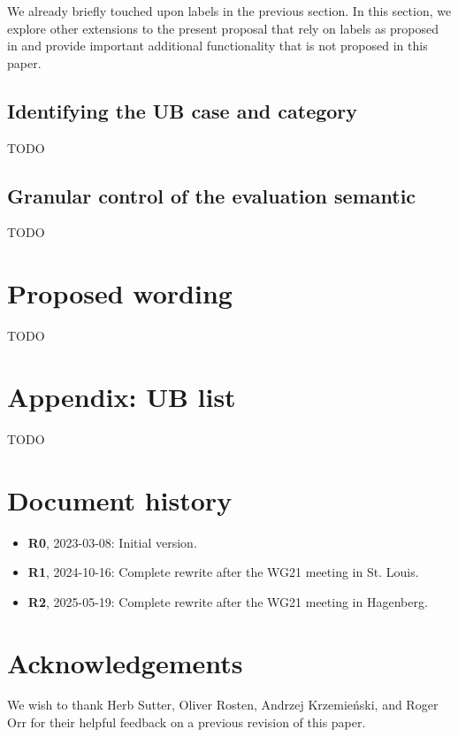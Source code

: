 We already briefly touched upon labels in the previous section. In this section, we explore other extensions to the present proposal that rely on labels as proposed in \cite{P3400R1} and provide important additional functionality that is not proposed in this paper.

\subsection{Identifying the UB case and category}
\label{category}

TODO

\subsection{Granular control of the evaluation semantic}
\label{semantic}

TODO



\section{Proposed wording}
\label{wording}

TODO

\section*{Appendix: UB list}

TODO

\section*{Document history}
\begin{itemize}
\item \textbf{R0}, 2023-03-08: Initial version.
\item \textbf{R1}, 2024-10-16: Complete rewrite after the WG21 meeting in St. Louis.
\item \textbf{R2}, 2025-05-19: Complete rewrite after the WG21 meeting in Hagenberg.
\end{itemize}

\section*{Acknowledgements}

We wish to thank Herb Sutter, Oliver Rosten, Andrzej Krzemie\' nski, and Roger Orr for their helpful feedback on a previous revision of this paper.


\renewcommand{\addcontentsline}[3]{}%







